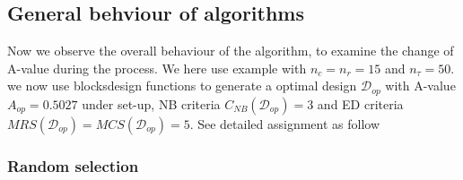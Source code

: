 \documentclass[
  a4paper,
  oneside,
  openany,
  12pt,
  onecolumn]{book}
\theoremstyle{plain}
\theoremstyle{definition}
\theoremstyle{remark}
\begin{document}
\subsection{General behviour of
algorithms}\label{general-behviour-of-algorithms}

Now we observe the overall behaviour of the algorithm, to examine the
change of A-value during the process. We here use example with
\(n_c=n_r=15\) and \(n_\tau=50\). we now use blocksdesign functions to
generate a optimal design \(\mathcal{D}_{op}\) with A-value
\(A_{op} = 0.5027\) under set-up, NB criteria
\(C_{NB}(\mathcal{D}_{op})=3\) and ED criteria
\(MRS(\mathcal{D}_{op})=MCS(\mathcal{D}_{op})=5\). See detailed
assignment as follow

\begin{figure}


\caption{\label{fig-align}}

\end{figure}%

\subsubsection{Random selection}\label{random-selection}
\end{document}

